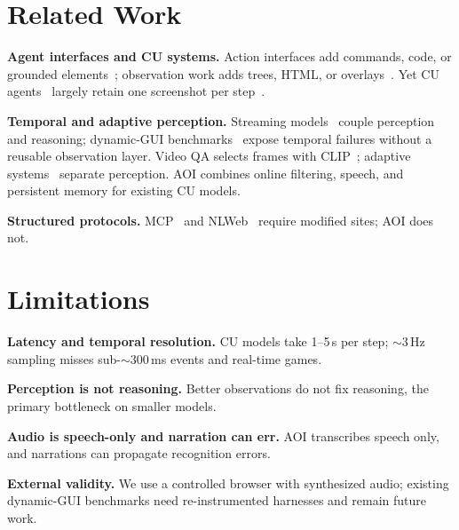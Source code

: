 \documentclass[letterpaper]{article} %
\begin{document}
\section{Related Work}
\label{sec:related}

\textbf{Agent interfaces and CU systems.}
Action interfaces add commands, code, or grounded elements~\citep{sweagent,codeact,mind2web}; observation work adds trees, HTML, or overlays~\citep{webarena,setofmark,seeact}. Yet CU agents~\citep{anthropic2024claude,openai2025cua,gemini25cu,surfer2,uitars2,opencua,fara7b,guiowl,coact,agents3} largely retain one screenshot per step~\citep{cusurvey}.

\textbf{Temporal and adaptive perception.}
Streaming models~\citep{geminilive,openairealtime} couple perception and reasoning; dynamic-GUI benchmarks~\citep{guiworld,videowebarena,cuasuite,memguibench} expose temporal failures without a reusable observation layer. Video QA selects frames with CLIP~\citep{videotree,aks,apollo}; adaptive systems~\citep{cradle,screenllm,streamagent,dispider} separate perception. AOI combines online filtering, speech, and persistent memory for existing CU models.

\textbf{Structured protocols.}
MCP~\citep{mcp} and NLWeb~\citep{nlweb} require modified sites; AOI does not.

\section{Limitations}
\label{sec:limitations}

\textbf{Latency and temporal resolution.}
CU models take 1--5\,s per step; ${\sim}3$\,Hz sampling misses
sub-${\sim}300$\,ms events and real-time games.

\textbf{Perception is not reasoning.}
Better observations do not fix reasoning, the primary bottleneck on smaller models.

\textbf{Audio is speech-only and narration can err.}
AOI transcribes speech only, and narrations can propagate recognition errors.

\textbf{External validity.}
We use a controlled browser with synthesized audio; existing dynamic-GUI benchmarks
need re-instrumented harnesses and remain future work.
\end{document}

